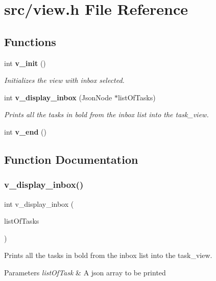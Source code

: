 \section{src/view.h File Reference}
\label{view_8h}
\subsection*{Functions}
\begin{DoxyCompactItemize}
\item 
int \textbf{ v\+\_\+init} ()
\begin{DoxyCompactList}\small\item\em Initializes the view with inbox selected. \end{DoxyCompactList}\item 
int \textbf{ v\+\_\+display\+\_\+inbox} (Json\+Node $\ast$list\+Of\+Tasks)
\begin{DoxyCompactList}\small\item\em Prints all the tasks in bold from the inbox list into the task\+\_\+view. \end{DoxyCompactList}\item 
int \textbf{ v\+\_\+end} ()
\end{DoxyCompactItemize}


\subsection{Function Documentation}
\mbox{\label{view_8h_a85e0e2098c355cce2ec6fde791d5d61a}} 
\subsubsection{v\+\_\+display\+\_\+inbox()}
{\footnotesize\ttfamily int v\+\_\+display\+\_\+inbox (\begin{DoxyParamCaption}\item[{Json\+Node $\ast$}]{list\+Of\+Tasks }\end{DoxyParamCaption})}



Prints all the tasks in bold from the inbox list into the task\+\_\+view. 


\begin{DoxyParams}{Parameters}
{\em list\+Of\+Task} & A json array to be printed \\
\hline
\end{DoxyParams}
\mbox{\label{view_8h_a7faf069285110922eedb83e61bcc4742}} 
